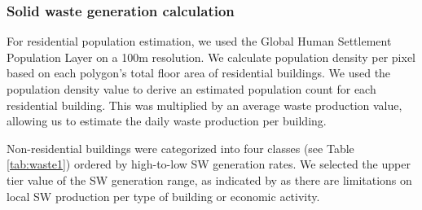 \documentclass[authoryear,preprint,review,11pt,doubleblind]{elsarticle}
\begin{document}

    \subsubsection{Solid waste generation calculation} \label{subsubsec:Generation}
    For residential population estimation, we used the Global Human Settlement Population Layer \citep{Schiavina2022} on a 100m resolution. We calculate population density per pixel based on each polygon's total floor area of residential buildings. We used the population density value to derive an estimated population count for each residential building. This was multiplied by an average waste production value, allowing us to estimate the daily waste production per building.
   
    Non-residential buildings were categorized into four classes (see Table \ref{tab:waste1}) ordered by high-to-low SW generation rates. We selected the upper tier value of the SW generation range, as indicated by \citet{Karadimas2008} as there are limitations on local SW production per type of building or economic activity.
\end{document}
